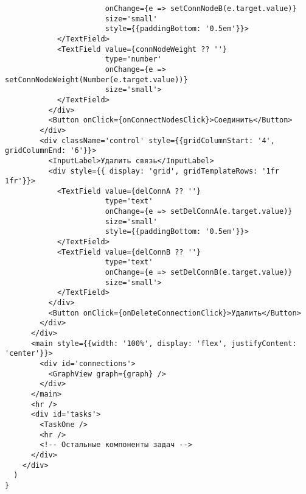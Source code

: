 \begin{verbatim}
                       onChange={e => setConnNodeB(e.target.value)}
                       size='small'
                       style={{paddingBottom: '0.5em'}}>
            </TextField>
            <TextField value={connNodeWeight ?? ''}
                       type='number'
                       onChange={e => setConnNodeWeight(Number(e.target.value))}
                       size='small'>
            </TextField>
          </div>
          <Button onClick={onConnectNodesClick}>Соединить</Button>
        </div>
        <div className='control' style={{gridColumnStart: '4', gridColumnEnd: '6'}}>
          <InputLabel>Удалить связь</InputLabel>
          <div style={{ display: 'grid', gridTemplateRows: '1fr 1fr'}}>
            <TextField value={delConnA ?? ''}
                       type='text'
                       onChange={e => setDelConnA(e.target.value)}
                       size='small'
                       style={{paddingBottom: '0.5em'}}>
            </TextField>
            <TextField value={delConnB ?? ''}
                       type='text'
                       onChange={e => setDelConnB(e.target.value)}
                       size='small'>
            </TextField>
          </div>
          <Button onClick={onDeleteConnectionClick}>Удалить</Button>
        </div>
      </div>
      <main style={{width: '100%', display: 'flex', justifyContent: 'center'}}>
        <div id='connections'>
          <GraphView graph={graph} />
        </div>
      </main>
      <hr />
      <div id='tasks'>
        <TaskOne />
        <hr />
        <!-- Остальные компоненты задач -->
      </div>
    </div>
  )
}
\end{verbatim}